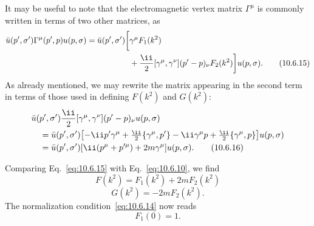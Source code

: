 It may be useful to note that the electromagnetic vertex matrix $\Gamma^\mu$
is commonly written in terms of two other matrices, as
\begin{align}
  \bar u(p',\sigma')\Gamma^\mu(p',p)u(p,\sigma)
  =\bar u(p',\sigma')\biggl[&\gamma^\mu F_1(k^2) \notag\\
  &+\frac{\ii}{2}[\gamma^\mu,\gamma^\nu](p'-p)_\nu F_2(k^2)
  \biggr]u(p,\sigma).
  \tag{10.6.15}\label{eq:10.6.15}
\end{align}
As already mentioned, we may rewrite the matrix appearing in the second term
in terms of those used in defining $F(k^2)$ and $G(k^2)$:
\begin{align}
  &\bar u(p',\sigma')\frac{\ii}{2}[\gamma^\mu,\gamma^\nu]
  (p'-p)_\nu u(p,\sigma) \notag\\
  &\quad=\bar u(p',\sigma')\bigl[
  -\ii\sl{p}'\gamma^\mu+\tfrac{\ii}{2}\{\gamma^\mu,\sl{p}'\}
  -\ii\gamma^\mu\sl{p}+\tfrac{\ii}{2}\{\gamma^\mu,\sl{p}\}
  \bigr]u(p,\sigma) \notag\\
  &\quad=\bar u(p',\sigma')
  [\ii(p^\mu+p'^\mu)+2m\gamma^\mu]u(p,\sigma).
  \tag{10.6.16}\label{eq:10.6.16}
\end{align}

Comparing Eq.~\eqref{eq:10.6.15} with Eq.~\eqref{eq:10.6.10}, we find
\begin{equation}
  F(k^2)=F_1(k^2)+2mF_2(k^2)
  \tag{10.6.17}\label{eq:10.6.17}
\end{equation}
\begin{equation}
  G(k^2)=-2mF_2(k^2).
  \tag{10.6.18}\label{eq:10.6.18}
\end{equation}
The normalization condition~\eqref{eq:10.6.14} now reads
\begin{equation*}
  F_1(0)=1.
\end{equation*}

